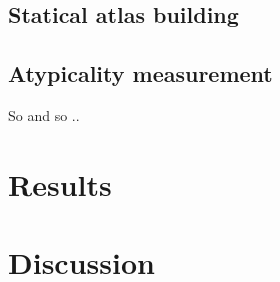 \documentclass{llncs}
\begin{document}
\subsection{Statical atlas building}
\label{sec:statical_atlas_building}
\subsection{Atypicality measurement}
\label{sec:atypicality_measurment}

So and so ..

\section{Results}
\label{sec:results}



\section{Discussion}
\label{sec:discussion}



\end{document}
